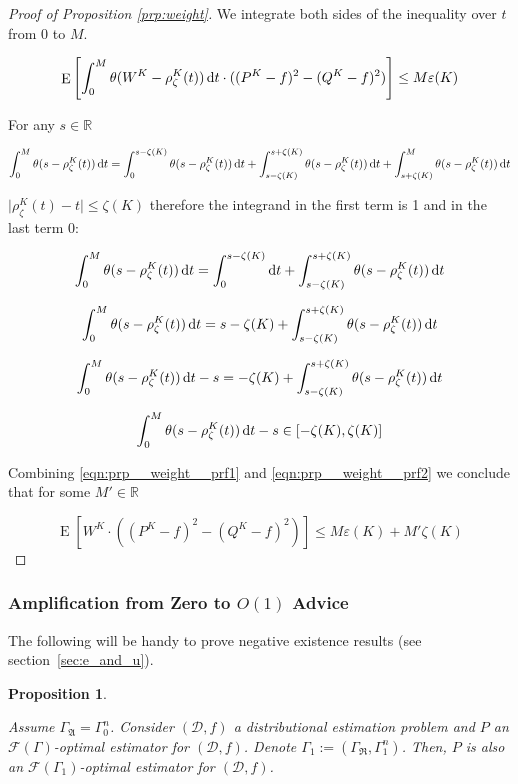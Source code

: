 \documentclass[11pt]{article}
\numberwithin{equation}{section}
\theoremstyle{definition}
\theoremstyle{plain}
\newtheorem{proposition}{Proposition}[section]
\DeclareMathOperator{\E}{E}
\newcommand{\Reals}{\mathbb{R}}
\newcommand{\Abs}[1]{\lvert #1 \rvert}
\newcommand{\Dist}{\mathcal{D}}
\newcommand{\GrowR}{\Gamma_{\mathfrak{R}}}
\newcommand{\GrowA}{\Gamma_{\mathfrak{A}}}
\newcommand{\Fall}{\mathcal{F}}
\newcommand{\EG}{\Fall(\Gamma)}
\begin{document}
\begin{proof}[Proof of Proposition \ref{prp:weight}]
We integrate both sides of the inequality over $t$ from 0 to $M$.

\begin{equation}
\label{eqn:prp__weight__prf1}
\E\left[\int_0^M\theta(W^{K}-\rho_\zeta^{K}(t)) \dif t \cdot ((P^{K}-f)^2-(Q^{K}-f)^2)\right] \leq M \varepsilon(K)
\end{equation}

For any $s \in \Reals$

$$\int_0^M \theta(s-\rho_\zeta^{K}(t)) \dif t = \int_0^{s-\zeta(K)} \theta(s-\rho_\zeta^{K}(t)) \dif t + \int_{s-\zeta(K)}^{s+\zeta(K)} \theta(s-\rho_\zeta^{K}(t)) \dif t + \int_{s+\zeta(K)}^M \theta(s-\rho_\zeta^{K}(t)) \dif t$$

$\Abs{\rho_\zeta^{K}(t)-t} \leq \zeta(K)$ therefore the integrand in the first term is 1 and in the last term 0:

$$\int_0^M \theta(s-\rho_\zeta^{K}(t)) \dif t = \int_0^{s-\zeta(K)} \dif t + \int_{s-\zeta(K)}^{s+\zeta(K)} \theta(s-\rho_\zeta^{K}(t)) \dif t$$

$$\int_0^M \theta(s-\rho_\zeta^{K}(t)) \dif t = s-\zeta(K) + \int_{s-\zeta(K)}^{s+\zeta(K)} \theta(s-\rho_\zeta^{K}(t)) \dif t$$

$$\int_0^M \theta(s-\rho_\zeta^{K}(t)) \dif t - s = -\zeta(K) + \int_{s-\zeta(K)}^{s+\zeta(K)} \theta(s-\rho_\zeta^{K}(t)) \dif t$$

\begin{equation}
\label{eqn:prp__weight__prf2}
\int_0^M \theta(s-\rho_\zeta^{K}(t)) \dif t - s \in [-\zeta(K),\zeta(K)]
\end{equation}

Combining \ref{eqn:prp__weight__prf1} and \ref{eqn:prp__weight__prf2} we conclude that for some $M' \in \Reals$

$$\E[W^{K} \cdot ((P^{K}-f)^2-(Q^{K}-f)^2)] \leq M \varepsilon(K) + M'\zeta(K)$$
\end{proof}

\subsubsection{Amplification from Zero to \texorpdfstring{$O(1)$}{O(1)} Advice}

The following will be handy to prove negative existence results (see section~\ref{sec:e_and_u}).

\begin{samepage}
\begin{proposition}
\label{prp:adv_amp}

Assume ${\GrowA=\Gamma_0^n}$. Consider ${(\Dist,f)}$ a distributional estimation problem and ${P}$ an ${\EG}$-optimal estimator for ${(\Dist,f)}$. Denote ${\Gamma_1:=(\GrowR,\Gamma_1^n)}$. Then, ${P}$ is also an ${\Fall(\Gamma_1)}$-optimal estimator for ${(\Dist,f)}$.

\end{proposition}
\end{samepage}
\end{document}
